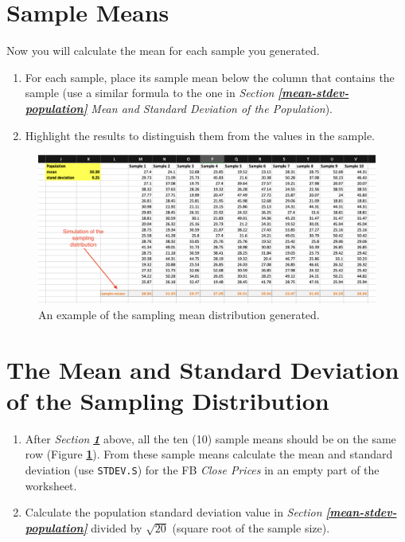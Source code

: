 \documentclass[
]{book}
\providecommand{\tightlist}{%
  \setlength{\itemsep}{0pt}\setlength{\parskip}{0pt}}
\begin{document}
\hypertarget{mean-samples}{%
\section{Sample Means}\label{mean-samples}}

Now you will calculate the mean for each sample you generated.

\begin{enumerate}
\def\labelenumi{\arabic{enumi}.}
\tightlist
\item
  For each sample, place its sample mean below the column that contains the sample (use a similar formula to the one in \emph{Section} \textbf{\emph{\ref{mean-stdev-population}}} \emph{Mean and Standard Deviation of the Population}).
\item
  Highlight the results to distinguish them from the values in the sample.
\end{enumerate}

\begin{figure}

{\centering \includegraphics[width=1\linewidth]{simualation-sampling-distribution} 

}

\caption{An example of the sampling mean distribution generated.}\label{fig:simualation-sampling-distribution}
\end{figure}

\hypertarget{the-mean-and-standard-deviation-of-the-sampling-distribution}{%
\section{The Mean and Standard Deviation of the Sampling Distribution}\label{the-mean-and-standard-deviation-of-the-sampling-distribution}}

\begin{enumerate}
\def\labelenumi{\arabic{enumi}.}
\item
  After \emph{Section} \textbf{\emph{\ref{mean-samples}}} above, all the ten (10) sample means should be on the same row (Figure \textbf{\ref{fig:simualation-sampling-distribution}}). From these sample means calculate the mean and standard deviation (use \texttt{STDEV.S}) for the FB \emph{Close Prices} in an empty part of the worksheet.
\item
  Calculate the population standard deviation value in \emph{Section} \textbf{\emph{\ref{mean-stdev-population}}} divided by \(\sqrt{20}\) (square root of the sample size).
\end{enumerate}
\end{document}
